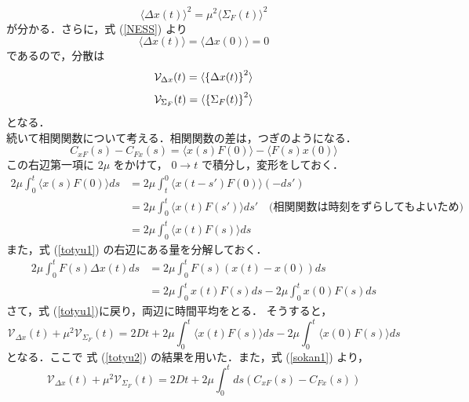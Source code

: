 \documentclass{jsarticle}
\numberwithin{equation}{section}
\theoremstyle{definition}
\begin{document}
\begin{equation}
  \langle \Delta x(t) \rangle^2 = \mu^2 \langle \Sigma_F (t) \rangle^2
\end{equation}
が分かる．さらに，式 (\ref{NESS}) より
\begin{equation}
  \langle \Delta x(t) \rangle = \langle \Delta x(0) \rangle = 0
\end{equation}
であるので，分散は
\begin{equation}
  \mathcal{V} _{\Delta x} (t) = \langle \qty{ \Delta x(t) } ^2 \rangle
\end{equation}
\begin{equation}
  \mathcal{V} _{\Sigma_F} (t) = \langle \qty{ \Sigma_F (t) } ^2 \rangle
\end{equation}
となる．\\
\quad 続いて相関関数について考える．相関関数の差は，つぎのようになる．
\begin{equation}
  \label{sokan1}
  C_{xF} (s) - C_{Fx} (s) = \langle x(s)F(0) \rangle - \langle F(s)x(0) \rangle
\end{equation}
この右辺第一項に $2 \mu$ をかけて， $0 \to t$ で積分し，変形をしておく．
\begin{align}
  2\mu \int_0^t \langle x(s)F(0) \rangle  ds &= 2\mu \int_t^0 \langle x(t - s')F(0) \rangle  (-ds') \\
  &= 2\mu \int_0^t \langle x(t)F(s') \rangle ds' \quad \text{(相関関数は時刻をずらしてもよいため)} \\
  &= 2\mu \int_0^t \langle x(t)F(s) \rangle ds
\end{align}
また，式 (\ref{totyu1}) の右辺にある量を分解しておく．
\begin{align}
  \label{totyu2}
  2\mu \int_0^t F(s) \Delta x(t) ds &= 2\mu \int_0^t F(s) (x(t) - x(0)) ds \\
  &=2\mu \int_0^t x(t)F(s) ds - 2\mu \int_0^t x(0) F(s) ds 
\end{align}
\quad さて，式 (\ref{totyu1})に戻り，両辺に時間平均をとる．
そうすると，
\begin{equation}
  \label{vsr1}
  \mathcal{V} _{\Delta x} (t) + \mu^2 \mathcal{V} _{\Sigma_F} (t)  = 2Dt + 2\mu \int_0^t \langle x(t)F(s) \rangle  ds - 2\mu \int_0^t \langle x(0) F(s) \rangle ds
\end{equation}
となる．ここで 式 (\ref{totyu2}) の結果を用いた．また，式 (\ref{sokan1}) より，
\begin{equation}
  \mathcal{V} _{\Delta x} (t) + \mu^2 \mathcal{V} _{\Sigma_F} (t) = 2Dt + 2\mu \int_0^t ds ( C_{xF} (s) - C_{Fx} (s) )
\end{equation}
\end{document}

